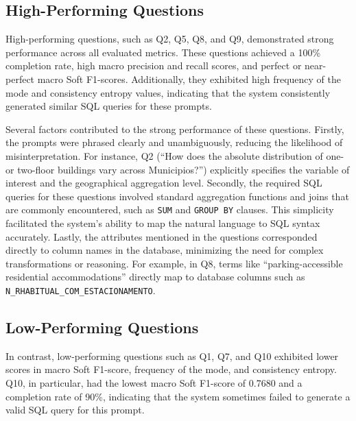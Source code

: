 \subsection{High-Performing Questions}

High-performing questions, such as Q2, Q5, Q8, and Q9, demonstrated strong performance across all evaluated metrics. These questions achieved a 100\% completion rate, high macro precision and recall scores, and perfect or near-perfect macro Soft F1-scores. Additionally, they exhibited high frequency of the mode and consistency entropy values, indicating that the system consistently generated similar SQL queries for these prompts.

Several factors contributed to the strong performance of these questions. Firstly, the prompts were phrased clearly and unambiguously, reducing the likelihood of misinterpretation. For instance, Q2 (“How does the absolute distribution of one- or two-floor buildings vary across Municipios?”) explicitly specifies the variable of interest and the geographical aggregation level. Secondly, the required SQL queries for these questions involved standard aggregation functions and joins that are commonly encountered, such as \texttt{SUM} and \texttt{GROUP BY} clauses. This simplicity facilitated the system's ability to map the natural language to SQL syntax accurately. Lastly, the attributes mentioned in the questions corresponded directly to column names in the database, minimizing the need for complex transformations or reasoning. For example, in Q8, terms like “parking-accessible residential accommodations” directly map to database columns such as \lstinline!N_RHABITUAL_COM_ESTACIONAMENTO!.


\subsection{Low-Performing Questions}

In contrast, low-performing questions such as Q1, Q7, and Q10 exhibited lower scores in macro Soft F1-score, frequency of the mode, and consistency entropy. Q10, in particular, had the lowest macro Soft F1-score of 0.7680 and a completion rate of 90\%, indicating that the system sometimes failed to generate a valid SQL query for this prompt.

